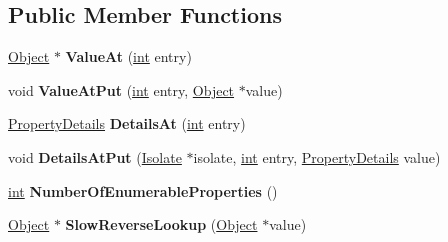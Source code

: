\subsection*{Public Member Functions}
\begin{DoxyCompactItemize}
\item 
\mbox{\label{classv8_1_1internal_1_1Dictionary_a9866313c164bfa1c509fa95d17320e5d}} 
\mbox{\hyperlink{classv8_1_1internal_1_1Object}{Object}} $\ast$ {\bfseries Value\+At} (\mbox{\hyperlink{classint}{int}} entry)
\item 
\mbox{\label{classv8_1_1internal_1_1Dictionary_a36e51ec390517289beba02d700981e90}} 
void {\bfseries Value\+At\+Put} (\mbox{\hyperlink{classint}{int}} entry, \mbox{\hyperlink{classv8_1_1internal_1_1Object}{Object}} $\ast$value)
\item 
\mbox{\label{classv8_1_1internal_1_1Dictionary_ab6109b2acf85c2b3723e89c523764cfc}} 
\mbox{\hyperlink{classv8_1_1internal_1_1PropertyDetails}{Property\+Details}} {\bfseries Details\+At} (\mbox{\hyperlink{classint}{int}} entry)
\item 
\mbox{\label{classv8_1_1internal_1_1Dictionary_ad50225c6c2233858aa04b243dabbe4c1}} 
void {\bfseries Details\+At\+Put} (\mbox{\hyperlink{classv8_1_1internal_1_1Isolate}{Isolate}} $\ast$isolate, \mbox{\hyperlink{classint}{int}} entry, \mbox{\hyperlink{classv8_1_1internal_1_1PropertyDetails}{Property\+Details}} value)
\item 
\mbox{\label{classv8_1_1internal_1_1Dictionary_a34a67ddad14f15f1280e30fc81950d5b}} 
\mbox{\hyperlink{classint}{int}} {\bfseries Number\+Of\+Enumerable\+Properties} ()
\item 
\mbox{\label{classv8_1_1internal_1_1Dictionary_a5b9cdec95325de8508bbd681721613f7}} 
\mbox{\hyperlink{classv8_1_1internal_1_1Object}{Object}} $\ast$ {\bfseries Slow\+Reverse\+Lookup} (\mbox{\hyperlink{classv8_1_1internal_1_1Object}{Object}} $\ast$value)
\item 
\mbox{\label{classv8_1_1internal_1_1Dictionary_a42ef34e4c2c39395fb8411335a83a13f}} 

\end{DoxyCompactItemize}
